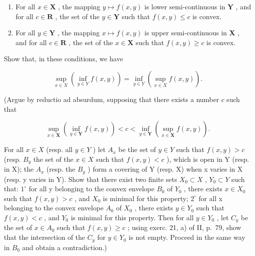 \begin{enumerate}
\def\labelenumi{(\roman{enumi})}
\item
  For all \(x \in \mathbf{X}\) , the mapping \(y \mapsto f(x, y)\) is lower semi-continuous in \(\mathbf{Y}\) , and for all \(c \in \mathbf{R}\) , the set of the \(y \in \mathbf{Y}\) such that \(f(x, y) \leqslant c\) is convex.
\item
  For all \(y \in \mathbf{Y}\) , the mapping \(x \mapsto f(x, y)\) is upper semi-continuous in \(\mathbf{X}\) , and for all \(c \in \mathbf{R}\) , the set of the \(x \in \mathbf{X}\) such that \(f(x, y) \geqslant c\) is convex.
\end{enumerate}

Show that, in these conditions, we have

\[
\sup _ {x \in X} (\inf _ {y \in Y} f (x, y)) = \inf _ {y \in Y} (\sup _ {x \in X} f (x, y)).
\]

(Argue by reductio ad absurdum, supposing that there exists a number \(c\) such that

\[
\sup _ {x \in \mathbf {X}} (\inf _ {y \in \mathbf {Y}} f (x, y)) <   c <   \inf _ {y \in \mathbf {Y}} (\sup _ {x \in \mathbf {X}} f (x, y)).
\]

For all \(x \in X\) (resp. all \(y \in Y\) ) let \(A_{x}\) be the set of \(y \in Y\) such that \(f(x, y) > c\) (resp. \(B_{y}\) the set of the \(x \in X\) such that \(f(x, y) < c\) ), which is open in Y (resp. in X); the \(A_{x}\) (resp. the \(B_{y}\) ) form a covering of Y (resp. X) when x varies in X (resp. y varies in Y). Show that there exist two finite sets \(X_{0} \subset X\) , \(Y_{0} \subset Y\) such that: \(1^{\circ}\) for all y belonging to the convex envelope \(B_{0}\) of \(Y_{0}\) , there exists \(x \in X_{0}\) such that \(f(x, y) > c\) , and \(X_{0}\) is minimal for this property; \(2^{\circ}\) for all x belonging to the convex envelope \(A_{0}\) of \(X_{0}\) , there exists \(y \in Y_{0}\) such that \(f(x, y) < c\) , and \(Y_{0}\) is minimal for this property. Then for all \(y \in Y_{0}\) , let \(C_{y}\) be the set of \(x \in A_{0}\) such that \(f(x, y) \geqslant c\) ; using exerc. 21, a) of II, p.~79, show that the intersection of the \(C_{y}\) for \(y \in Y_{0}\) is not empty. Proceed in the same way in \(B_{0}\) and obtain a contradiction.)

